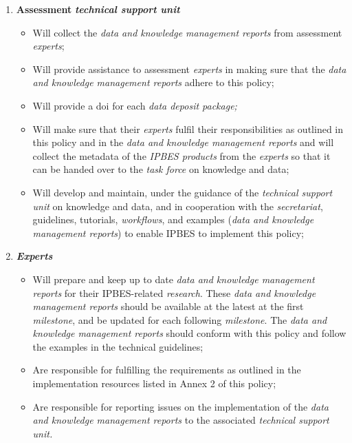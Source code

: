 \documentclass{article}
\begin{document}
\begin{enumerate}[label=(\alph*)]
    \item \textbf{Assessment }\textit{\textbf{technical support unit}}
    \begin{itemize}
        \item Will collect the \textit{data and knowledge management reports} from assessment \textit{experts};
        \item Will provide assistance to assessment \textit{experts} in making sure that the \textit{data and knowledge management reports} adhere to this policy;
        \item Will provide a \gls{doi} for each \textit{data deposit package;}
        \item Will make sure that their \textit{experts }fulfil their responsibilities as outlined in this policy and in the \textit{data and knowledge management reports} and will collect the metadata of the \textit{IPBES products }from the \textit{experts} so that it can be handed over to the \textit{task force }on knowledge and data;
        \item Will develop and maintain, under the guidance of the \textit{technical support unit} on knowledge and data, and in cooperation with the \textit{secretariat}, guidelines, tutorials, \textit{workflows}, and examples (\textit{data and knowledge management reports}) to enable IPBES to implement this policy;
    \end{itemize}

    \item \textit{\textbf{Experts}}
    \begin{itemize}
        \item Will prepare and keep up to date \textit{data and knowledge management reports} for their IPBES-related \textit{research}. These \textit{data and knowledge management reports }should be available at the latest at the first \textit{milestone}, and be updated for each following \textit{milestone}. The \textit{data and knowledge management reports} should conform with this policy and follow the examples in the technical guidelines;
        \item Are responsible for fulfilling the requirements as outlined in the implementation resources listed in Annex 2 of this policy;
        \item Are responsible for reporting issues on the implementation of the \textit{data and knowledge management reports} to the associated \textit{technical support unit.}
    \end{itemize}
\end{enumerate}
\end{document}
